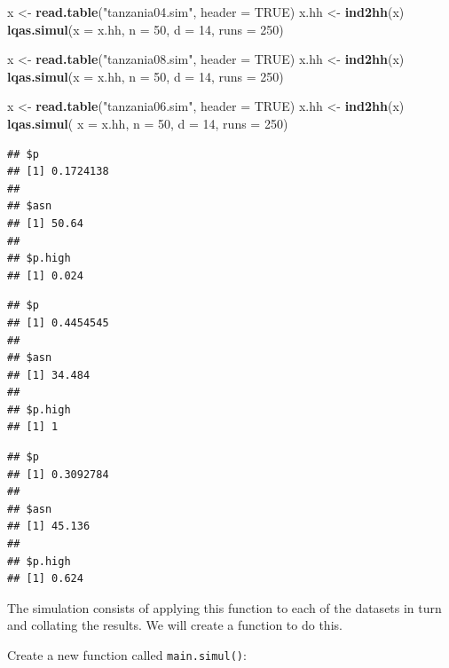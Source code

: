 \documentclass[12pt,a4paper]{book}
\newenvironment{Shaded}{\begin{snugshade}}{\end{snugshade}}
\newcommand{\DataTypeTok}[1]{\textcolor[rgb]{0.13,0.29,0.53}{#1}}
\newcommand{\DecValTok}[1]{\textcolor[rgb]{0.00,0.00,0.81}{#1}}
\newcommand{\KeywordTok}[1]{\textcolor[rgb]{0.13,0.29,0.53}{\textbf{#1}}}
\newcommand{\NormalTok}[1]{#1}
\newcommand{\OtherTok}[1]{\textcolor[rgb]{0.56,0.35,0.01}{#1}}
\newcommand{\StringTok}[1]{\textcolor[rgb]{0.31,0.60,0.02}{#1}}
\theoremstyle{definition}
\theoremstyle{definition}
\theoremstyle{definition}
\theoremstyle{remark}
\begin{document}
\begin{Shaded}
\begin{Highlighting}[]
\NormalTok{x <-}\StringTok{ }\KeywordTok{read.table}\NormalTok{(}\StringTok{"tanzania04.sim"}\NormalTok{, }\DataTypeTok{header =} \OtherTok{TRUE}\NormalTok{)}
\NormalTok{x.hh <-}\StringTok{ }\KeywordTok{ind2hh}\NormalTok{(x)}
\KeywordTok{lqas.simul}\NormalTok{(}\DataTypeTok{x =}\NormalTok{ x.hh, }\DataTypeTok{n =} \DecValTok{50}\NormalTok{, }\DataTypeTok{d =} \DecValTok{14}\NormalTok{, }\DataTypeTok{runs =} \DecValTok{250}\NormalTok{)}

\NormalTok{x <-}\StringTok{ }\KeywordTok{read.table}\NormalTok{(}\StringTok{"tanzania08.sim"}\NormalTok{, }\DataTypeTok{header =} \OtherTok{TRUE}\NormalTok{)}
\NormalTok{x.hh <-}\StringTok{ }\KeywordTok{ind2hh}\NormalTok{(x)}
\KeywordTok{lqas.simul}\NormalTok{(}\DataTypeTok{x =}\NormalTok{ x.hh, }\DataTypeTok{n =} \DecValTok{50}\NormalTok{, }\DataTypeTok{d =} \DecValTok{14}\NormalTok{, }\DataTypeTok{runs =} \DecValTok{250}\NormalTok{)}

\NormalTok{x <-}\StringTok{ }\KeywordTok{read.table}\NormalTok{(}\StringTok{"tanzania06.sim"}\NormalTok{, }\DataTypeTok{header =} \OtherTok{TRUE}\NormalTok{)}
\NormalTok{x.hh <-}\StringTok{ }\KeywordTok{ind2hh}\NormalTok{(x)}
\KeywordTok{lqas.simul}\NormalTok{( }\DataTypeTok{x =}\NormalTok{ x.hh, }\DataTypeTok{n =} \DecValTok{50}\NormalTok{, }\DataTypeTok{d =} \DecValTok{14}\NormalTok{, }\DataTypeTok{runs =} \DecValTok{250}\NormalTok{)}
\end{Highlighting}
\end{Shaded}

\begin{verbatim}
## $p
## [1] 0.1724138
## 
## $asn
## [1] 50.64
## 
## $p.high
## [1] 0.024
\end{verbatim}

\begin{verbatim}
## $p
## [1] 0.4454545
## 
## $asn
## [1] 34.484
## 
## $p.high
## [1] 1
\end{verbatim}

\begin{verbatim}
## $p
## [1] 0.3092784
## 
## $asn
## [1] 45.136
## 
## $p.high
## [1] 0.624
\end{verbatim}

The simulation consists of applying this function to each of the
datasets in turn and collating the results. We will create a function to
do this.

Create a new function called \texttt{main.simul()}:
\end{document}
